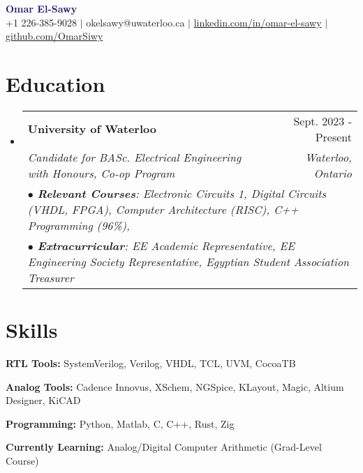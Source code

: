 \documentclass[letterpaper,11pt]{article}
\makeatletter
\newcommand{\resumeEducationHeading}[6]{
  \vspace{-2pt}\item
    \begin{tabular*}{0.97\textwidth}[t]{l@{\extracolsep{\fill}}r}
      \textbf{#1} & \small{#2} \\
      \textit{\small#3} & \textit{\small #4} \\
      \multicolumn{2}{p{\textwidth}}{\hspace{5mm}\textit{\small#5}} \\ %
      \multicolumn{2}{p{\textwidth}}{\hspace{5mm}\textit{\small#6}} \\
    \end{tabular*}\vspace{-10pt} %
}
\newcommand{\resumeSubHeadingListStart}{\begin{itemize}[leftmargin=0.0in, label={}]}
\newcommand{\resumeSubHeadingListEnd}{\end{itemize}}
\makeatother
\begin{document}
{\centering
    {\Huge\textbf{\textcolor{MidnightBlue}{Omar El-Sawy}}}\\[5pt] %
    \footnotesize
    \hspace{.5pt} {+1 226-385-9028}
    $|$
    \faAt \hspace{.5pt} {okelsawy@uwaterloo.ca}
    $|$
    \faLinkedinSquare \hspace{.5pt} \href{https://www.linkedin.com/in/omar-el-sawy/}{linkedin.com/in/omar-el-sawy}
    $|$
    \faGithub \hspace{.5pt} \href{https://github.com/OmarSiwy}{github.com/OmarSiwy}
    \par
}

\section{\textbf{Education}}
  \vspace{3pt}
    \begin{itemize}[leftmargin=*, label={}]
      \resumeEducationHeading
        {University of Waterloo}        %
        {Sept. 2023 - Present}          %
        {Candidate for BASc. Electrical Engineering with Honours, Co-op Program}   %
        {Waterloo, Ontario}             %
        {$\bullet$ \textbf{Relevant Courses}: Electronic Circuits 1, Digital Circuits (VHDL, FPGA), Computer Architecture (RISC), C++ Programming (96\%),}  %
        {$\bullet$ \textbf{Extracurricular}: EE Academic Representative, EE Engineering Society Representative, Egyptian Student Association Treasurer} %
    \end{itemize}

\section{\textbf{Skills}}
  \vspace{2pt}
  \resumeSubHeadingListStart
    \small{\item{
        \textbf{RTL Tools:}{ SystemVerilog, Verilog, VHDL, TCL, UVM, CocoaTB } \\ \vspace{3pt}

        \textbf{Analog Tools:}{ Cadence Innovus, XSchem, NGSpice, KLayout, Magic, Altium Designer, KiCAD } \\ \vspace{3pt}

        \textbf{Programming:}{ Python, Matlab, C, C++, Rust, Zig } \\ \vspace{3pt}

        \textbf{Currently Learning:}{ Analog/Digital Computer Arithmetic (Grad-Level Course) } \\ \vspace{3pt}
    }}
  \resumeSubHeadingListEnd
\end{document}
